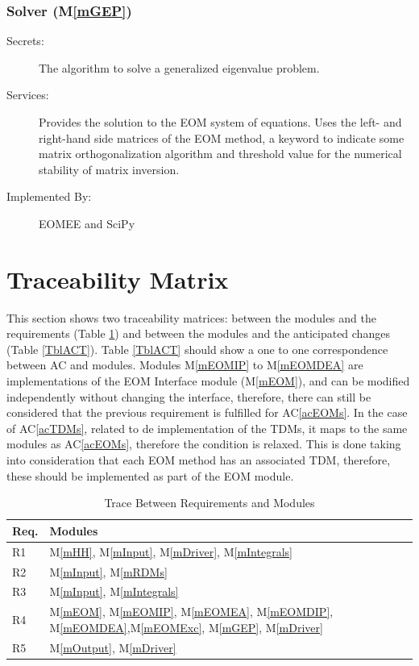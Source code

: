 \documentclass[12pt, titlepage]{article}
\newcommand{\acref}[1]{AC\ref{#1}}
\newcommand{\mref}[1]{M\ref{#1}}
\begin{document}
\subsubsection{Solver (\mref{mGEP})}

\begin{description}
	\item[Secrets:] The algorithm to solve a generalized eigenvalue problem.
	\item[Services:] Provides the solution to the EOM system of equations. Uses 
	the left- and right-hand side matrices of the EOM method, a keyword to 
	indicate some matrix orthogonalization algorithm and threshold value for 
	the numerical stability of matrix inversion.
	\item[Implemented By:] EOMEE and SciPy
\end{description}

\section{Traceability Matrix} \label{SecTM}

This section shows two traceability matrices: between the modules and the
requirements (Table \ref{TblRT}) and between the modules and the anticipated 
changes (Table \ref{TblACT}). Table \ref{TblACT} should show a one 
to one correspondence between AC and modules. Modules \mref{mEOMIP} to 
\mref{mEOMDEA} are implementations of the EOM Interface module 
(\mref{mEOM}), and can be modified independently without changing the 
interface, therefore, there can still be considered that the previous 
requirement is fulfilled for \acref{acEOMs}. In the case of \acref{acTDMs}, 
related to de implementation of the TDMs, it maps to the same modules as 
\acref{acEOMs}, therefore the condition is relaxed. This is done taking into 
consideration that each EOM method has an associated TDM, therefore, these 
should be implemented as part of the EOM module.

\begin{table}[H]
\centering
\begin{tabular}{p{} p{}}
\toprule
\textbf{Req.} & \textbf{Modules}\\
\midrule
R1 & \mref{mHH}, \mref{mInput}, \mref{mDriver}, \mref{mIntegrals}\\
R2 & \mref{mInput}, \mref{mRDMs}\\
R3 & \mref{mInput}, \mref{mIntegrals}\\
R4 & \mref{mEOM}, \mref{mEOMIP}, \mref{mEOMEA}, \mref{mEOMDIP}, 
\mref{mEOMDEA},\mref{mEOMExc}, \mref{mGEP}, \mref{mDriver}\\
R5 & \mref{mOutput}, \mref{mDriver}\\
\bottomrule
\end{tabular}
\caption{Trace Between Requirements and Modules}
\label{TblRT}
\end{table}
\end{document}
